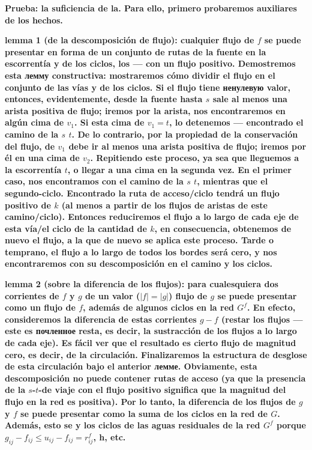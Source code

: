 \bf{Prueba: la suficiencia de la}. Para ello, primero probaremos auxiliares de los hechos.

\bf{lemma 1} (de la descomposición de flujo): cualquier flujo de $f$ se puede presentar en forma de un conjunto de rutas de la fuente en la escorrentía y de los ciclos, los --- con un flujo positivo. Demostremos esta лемму constructiva: mostraremos cómo dividir el flujo en el conjunto de las vías y de los ciclos. Si el flujo tiene ненулевую valor, entonces, evidentemente, desde la fuente hasta $s$ sale al menos una arista positiva de flujo; iremos por la arista, nos encontraremos en algún cima de $v_1$. Si esta cima de $v_1 = t$, lo detenemos --- encontrado el camino de la $s$ $t$. De lo contrario, por la propiedad de la conservación del flujo, de $v_1$ debe ir al menos una arista positiva de flujo; iremos por él en una cima de $v_2$. Repitiendo este proceso, ya sea que lleguemos a la escorrentía $t$, o llegar a una cima en la segunda vez. En el primer caso, nos encontramos con el camino de la $s$ $t$, mientras que el segundo-ciclo. Encontrado la ruta de acceso/ciclo tendrá un flujo positivo de $k$ (al menos a partir de los flujos de aristas de este camino/ciclo). Entonces reduciremos el flujo a lo largo de cada eje de esta vía/el ciclo de la cantidad de $k$, en consecuencia, obtenemos de nuevo el flujo, a la que de nuevo se aplica este proceso. Tarde o temprano, el flujo a lo largo de todos los bordes será cero, y nos encontraremos con su descomposición en el camino y los ciclos.

\bf{lemma 2} (sobre la diferencia de los flujos): para cualesquiera dos corrientes de $f$ y $g$ de un valor ($|f| = |g|$) flujo de $g$ se puede presentar como un flujo de $f$, además de algunos ciclos en la red $G^f$. En efecto, consideremos la diferencia de estas corrientes $g-f$ (restar los flujos --- este es почленное resta, es decir, la sustracción de los flujos a lo largo de cada eje). Es fácil ver que el resultado es cierto flujo de magnitud cero, es decir, de la circulación. Finalizaremos la estructura de desglose de esta circulación bajo el anterior лемме. Obviamente, esta descomposición no puede contener rutas de acceso (ya que la presencia de la $s$-$t$-de viaje con el flujo positivo significa que la magnitud del flujo en la red es positiva). Por lo tanto, la diferencia de los flujos de $g$ y $f$ se puede presentar como la suma de los ciclos en la red de $G$. Además, esto se y los ciclos de las aguas residuales de la red $G^f$ porque $g_{ij} - f_{ij} \le u_{ij} - f_{ij} = r_{ij}^f$, h, etc.

